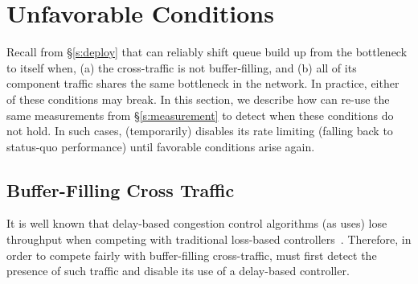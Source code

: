 \section{Unfavorable Conditions}\label{s:queue-ctl}

Recall from \S\ref{s:deploy} that \name can reliably shift queue build up from the bottleneck to itself when, (a) the cross-traffic is not buffer-filling, and (b) all of its component traffic shares the same bottleneck in the network.
In practice, either of these conditions may break. 
In this section, we describe how \name can re-use the same measurements from \S\ref{s:measurement} to detect when these conditions do not hold. In such cases, \name (temporarily) disables its rate limiting (falling back to status-quo performance) until favorable conditions arise again. 

\subsection{Buffer-Filling Cross Traffic}
\label{s:buffer-filling}



It is well known that delay-based congestion control algorithms (as \name uses) lose throughput when competing with traditional loss-based controllers~\cite{copa}. Therefore, in order to compete fairly with buffer-filling cross-traffic, \name must first detect the presence of such traffic and disable its use of a delay-based controller.  

